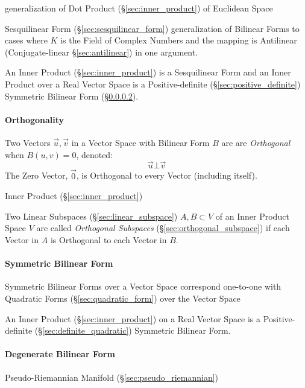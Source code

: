 generalization of Dot Product (\S\ref{sec:inner_product}) of Euclidean Space

Sesquilinear Form (\S\ref{sec:sesquilinear_form}) generalization of Bilinear
Forms to cases where $K$ is the Field of Complex Numbers and the mapping is
Antilinear (Conjugate-linear \S\ref{sec:antilinear}) in one argument.

An Inner Product (\S\ref{sec:inner_product}) is a Sesquilinear Form and an
Inner Product over a Real Vector Space is a Positive-definite
(\S\ref{sec:positive_definite}) Symmetric Bilinear Form
(\S\ref{sec:symmetric_bilinear}).



\paragraph{Orthogonality}\label{sec:orthogonality}\hfill

Two Vectors $\vec{u}, \vec{v}$ in a Vector Space with Bilinear Form $B$
are are \emph{Orthogonal} when $B(u,v) = 0$, denoted:
\[
  \vec{u} \bot \vec{v}
\]
The Zero Vector, $\vec{0}$, is Orthogonal to every Vector (including itself).

\fist Inner Product (\S\ref{sec:inner_product})

Two Linear Subspaces (\S\ref{sec:linear_subspace}) $A, B \subset V$ of an Inner
Product Space $V$ are called \emph{Orthogonal Subspaces}
(\S\ref{sec:orthogonal_subspace}) if each Vector in $A$ is Orthogonal to each
Vector in $B$.



\paragraph{Symmetric Bilinear Form}\label{sec:symmetric_bilinear}\hfill

Symmetric Bilinear Forms over a Vector Space correspond one-to-one
with Quadratic Forms (\S\ref{sec:quadratic_form}) over the Vector
Space

An Inner Product (\S\ref{sec:inner_product}) on a Real Vector Space is
a Positive-definite (\S\ref{sec:definite_quadratic}) Symmetric
Bilinear Form.



\paragraph{Degenerate Bilinear Form}
\label{sec:degenerate_bilinear_form}\hfill

Pseudo-Riemannian Manifold (\S\ref{sec:pseudo_riemannian})



